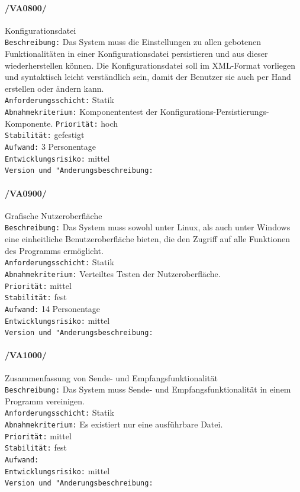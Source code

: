 \paragraph{/VA0800/} Konfigurationsdatei\\
\texttt{Beschreibung:} Das System muss die Einstellungen zu allen gebotenen
Funktionalitäten in einer Konfigurationsdatei persistieren und aus dieser
wiederherstellen können. Die Konfigurationsdatei soll im XML-Format vorliegen
und syntaktisch leicht verständlich sein, damit der Benutzer sie auch per Hand
erstellen oder ändern kann.\\
\texttt{Anforderungsschicht:} Statik\\
\texttt{Abnahmekriterium:} Komponententest der
Konfigurations-Persistierungs-Komponente.
\texttt{Priorität:} hoch\\
\texttt{Stabilität:} gefestigt\\
\texttt{Aufwand:} 3 Personentage\\
\texttt{Entwicklungsrisiko:} mittel\\
\texttt{Version und "Anderungsbeschreibung:}

\paragraph{/VA0900/} Grafische Nutzeroberfläche\\
\texttt{Beschreibung:} Das System muss sowohl unter Linux, als auch unter
Windows eine einheitliche Benutzeroberfläche bieten, die den Zugriff auf alle Funktionen
des Programms ermöglicht.\\
\texttt{Anforderungsschicht:} Statik\\
\texttt{Abnahmekriterium:}  Verteiltes Testen der Nutzeroberfläche.\\
\texttt{Priorität:} mittel\\
\texttt{Stabilität:} fest\\
\texttt{Aufwand:} 14 Personentage\\
\texttt{Entwicklungsrisiko:} mittel\\
\texttt{Version und "Anderungsbeschreibung:}

\paragraph{/VA1000/} Zusammenfassung von Sende- und Empfangsfunktionalität\\
\texttt{Beschreibung:} Das System muss Sende- und Empfangsfunktionalität in
einem Programm vereinigen.\\
\texttt{Anforderungsschicht:} Statik\\
\texttt{Abnahmekriterium:} Es existiert nur eine ausführbare Datei.\\
\texttt{Priorität:} mittel\\
\texttt{Stabilität:} fest\\
\texttt{Aufwand:}\\
\texttt{Entwicklungsrisiko:} mittel\\
\texttt{Version und "Anderungsbeschreibung:}

